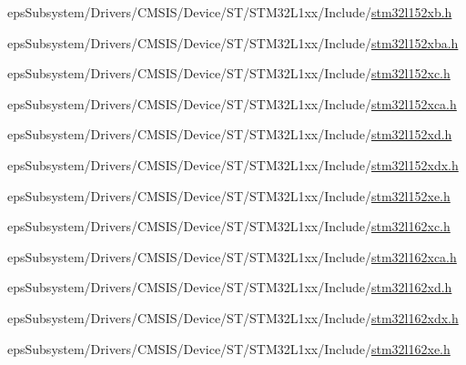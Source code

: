 \begin{DoxyCompactItemize}
eps\-Subsystem/\-Drivers/\-C\-M\-S\-I\-S/\-Device/\-S\-T/\-S\-T\-M32\-L1xx/\-Include/\hyperlink{stm32l152xb_8h}{stm32l152xb.\-h}\item 
eps\-Subsystem/\-Drivers/\-C\-M\-S\-I\-S/\-Device/\-S\-T/\-S\-T\-M32\-L1xx/\-Include/\hyperlink{stm32l152xba_8h}{stm32l152xba.\-h}\item 
eps\-Subsystem/\-Drivers/\-C\-M\-S\-I\-S/\-Device/\-S\-T/\-S\-T\-M32\-L1xx/\-Include/\hyperlink{stm32l152xc_8h}{stm32l152xc.\-h}\item 
eps\-Subsystem/\-Drivers/\-C\-M\-S\-I\-S/\-Device/\-S\-T/\-S\-T\-M32\-L1xx/\-Include/\hyperlink{stm32l152xca_8h}{stm32l152xca.\-h}\item 
eps\-Subsystem/\-Drivers/\-C\-M\-S\-I\-S/\-Device/\-S\-T/\-S\-T\-M32\-L1xx/\-Include/\hyperlink{stm32l152xd_8h}{stm32l152xd.\-h}\item 
eps\-Subsystem/\-Drivers/\-C\-M\-S\-I\-S/\-Device/\-S\-T/\-S\-T\-M32\-L1xx/\-Include/\hyperlink{stm32l152xdx_8h}{stm32l152xdx.\-h}\item 
eps\-Subsystem/\-Drivers/\-C\-M\-S\-I\-S/\-Device/\-S\-T/\-S\-T\-M32\-L1xx/\-Include/\hyperlink{stm32l152xe_8h}{stm32l152xe.\-h}\item 
eps\-Subsystem/\-Drivers/\-C\-M\-S\-I\-S/\-Device/\-S\-T/\-S\-T\-M32\-L1xx/\-Include/\hyperlink{stm32l162xc_8h}{stm32l162xc.\-h}\item 
eps\-Subsystem/\-Drivers/\-C\-M\-S\-I\-S/\-Device/\-S\-T/\-S\-T\-M32\-L1xx/\-Include/\hyperlink{stm32l162xca_8h}{stm32l162xca.\-h}\item 
eps\-Subsystem/\-Drivers/\-C\-M\-S\-I\-S/\-Device/\-S\-T/\-S\-T\-M32\-L1xx/\-Include/\hyperlink{stm32l162xd_8h}{stm32l162xd.\-h}\item 
eps\-Subsystem/\-Drivers/\-C\-M\-S\-I\-S/\-Device/\-S\-T/\-S\-T\-M32\-L1xx/\-Include/\hyperlink{stm32l162xdx_8h}{stm32l162xdx.\-h}\item 
eps\-Subsystem/\-Drivers/\-C\-M\-S\-I\-S/\-Device/\-S\-T/\-S\-T\-M32\-L1xx/\-Include/\hyperlink{stm32l162xe_8h}{stm32l162xe.\-h}\end{DoxyCompactItemize}
